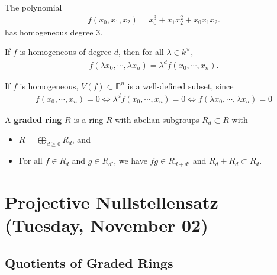 \begin{example}[?]

The polynomial
\begin{align*}  
f(x_0, x_1, x_2) = x_0^3 + x_1 x_2^2 + x_0 x_1 x_2
.\end{align*}
has homogeneous degree 3.

\end{example}

\begin{remark}

If \(f\) is homogeneous of degree \(d\), then for all
\(\lambda \in k^{\times}\),
\begin{align*}  
f(\lambda x_0, \cdots, \lambda x_n) = \lambda^d f(x_0, \cdots, x_n)
.\end{align*}

If \(f\) is homogeneous, \(V(f) \subset {\mathbb{P}}^n\) is a
well-defined subset, since
\begin{align*}
f(x_0, \cdots, x_n) = 0 \iff \lambda^d f(x_0, \cdots, x_n) = 0 \iff f(\lambda x_0, \cdots, \lambda x_n) = 0
\end{align*}

\end{remark}

\begin{definition}

A \textbf{graded ring} \(R\) is a ring \(R\) with abelian subgroups
\(R_d \subset R\) with

\begin{itemize}
\tightlist
\item
  \(R = \bigoplus_{d\geq 0} R_d\), and
\item
  For all \(f\in R_d\) and \(g\in R_{d'}\), we have \(fg \in R_{d+d'}\)
  and \(R_d + R_{d} \subset R_d\).
\end{itemize}

\end{definition}

\hypertarget{projective-nullstellensatz-tuesday-november-02}{%
\section{Projective Nullstellensatz (Tuesday, November
02)}\label{projective-nullstellensatz-tuesday-november-02}}

\hypertarget{quotients-of-graded-rings}{%
\subsection{Quotients of Graded Rings}\label{quotients-of-graded-rings}}


